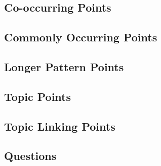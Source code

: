     \subsection{Co-occurring Points}
    \subsection{Commonly Occurring Points}
    \subsection{Longer Pattern Points}
    \subsection{Topic Points}
    \subsection{Topic Linking Points}
    \subsection{Questions}
